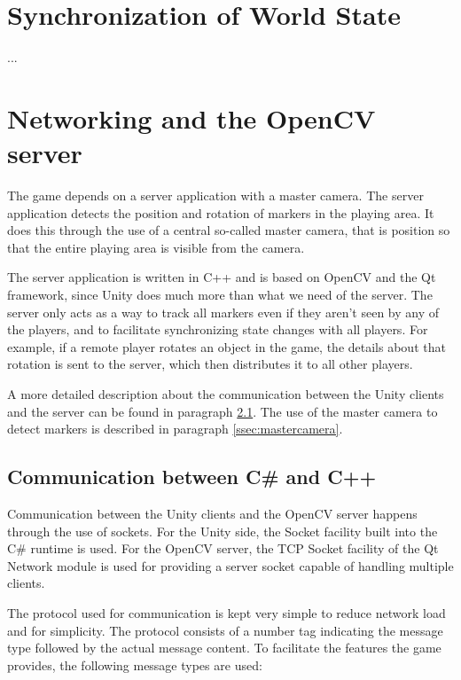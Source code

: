 	\section{Synchronization of World State} \label{sec:synchronization}
		...
		
	\section{Networking and the OpenCV server} \label{sec:network}
		The game depends on a server application with a master camera. The 
        server application detects the position and rotation of markers in the 
        playing area. It does this through the use of a central so-called master 
        camera, that is position so that the entire playing area is visible from 
        the camera.
        
        The server application is written in C++ and is based on OpenCV and the Qt 
        framework, since Unity does much more than what we need of the server. 
        The server only acts as a way to track all markers even if they aren't 
        seen by any of the players, and to facilitate synchronizing state 
        changes with all players. For example, if a remote player rotates an 
        object in the game, the details about that rotation is sent to the 
        server, which then distributes it to all other players.
        
        A more detailed description about the communication between the Unity 
        clients and the server can be found in paragraph \ref{ssec:communication}.
        The use of the master camera to detect markers is described in paragraph
        \ref{ssec:mastercamera}.
         		
		\subsection{Communication between C\# and C++} \label{ssec:communication}
			Communication between the Unity clients and the OpenCV server 
            happens through the use of sockets. For the Unity side, the Socket 
            facility built into the C\# runtime is used. For the OpenCV server, 
            the TCP Socket facility of the Qt Network module is used for 
            providing a server socket capable of handling multiple clients. 
            
            The protocol used for communication is kept very simple to reduce 
            network load and for simplicity. The protocol consists of a number
            tag indicating the message type followed by the actual message 
            content. To facilitate the features the game provides, the following
            message types are used:
            
